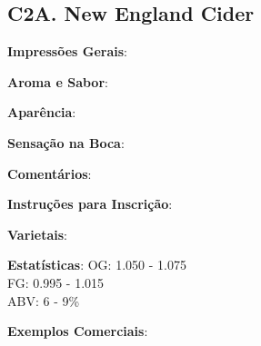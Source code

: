 \subsection*{C2A. New England Cider}

\textbf{Impressões Gerais}:

\textbf{Aroma e Sabor}:

\textbf{Aparência}:

\textbf{Sensação na Boca}:

\textbf{Comentários}:

\textbf{Instruções para Inscrição}:

\textbf{Varietais}:

\textbf{Estatísticas}: OG: 1.050 - 1.075 \\
\phantom{ } \hspace{16.5mm} FG: 0.995 - 1.015 \\
\phantom{ } \hspace{16.5mm} ABV: 6 - 9\%

\textbf{Exemplos Comerciais}: